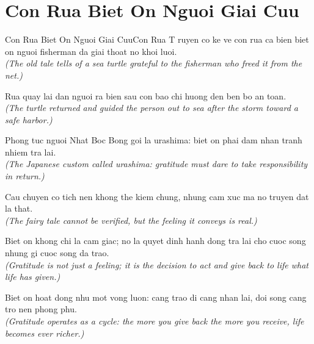 \section{Con Rua Biet On Nguoi Giai Cuu}
\begin{truyen}{Con Rua Biet On Nguoi Giai Cuu}{Con Rua}
T ruyen co ke ve con rua ca bien biet on nguoi fisherman da giai thoat no khoi luoi.\\
\textit{(The old tale tells of a sea turtle grateful to the fisherman who freed it from the net.)}

Rua quay lai dan nguoi ra bien sau con bao chi huong den ben bo an toan.\\
\textit{(The turtle returned and guided the person out to sea after the storm toward a safe harbor.)}

Phong tuc nguoi Nhat Boc Bong goi la urashima: biet on phai dam nhan tranh nhiem tra lai.\\
\textit{(The Japanese custom called urashima: gratitude must dare to take responsibility in return.)}

Cau chuyen co tich nen khong the kiem chung, nhung cam xuc ma no truyen dat la that.\\
\textit{(The fairy tale cannot be verified, but the feeling it conveys is real.)}

Biet on khong chi la cam giac; no la quyet dinh hanh dong tra lai cho cuoc song nhung gi cuoc song da trao.\\
\textit{(Gratitude is not just a feeling; it is the decision to act and give back to life what life has given.)}

\end{truyen}
\begin{baihoc}
  Biet on hoat dong nhu mot vong luon: cang trao di cang nhan lai, doi song cang tro nen phong phu.\\
  \textit{(Gratitude operates as a cycle: the more you give back the more you receive, life becomes ever richer.)}
\end{baihoc}

